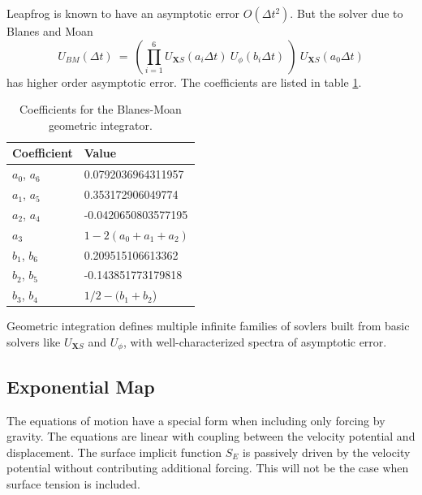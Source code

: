 \documentclass{article}
\def\Xvec{\textbf{X}}
\def\dt{\Delta t}
\begin{document}
Leapfrog is known to have an asymptotic error $O(\dt^2)$.  But the solver due to Blanes and Moan
\begin{equation}
U_{BM}(\dt) \ =\ \left( \prod_{i=1}^6 U_{\Xvec S}(a_i \dt)\ U_{\phi}(b_i \dt)\  \right) \  U_{\Xvec S}(a_0 \dt)
\end{equation}
has higher order asymptotic error.  The coefficients are listed in table \ref{bmcoeffs}.
\begin{table}
\begin{center}
\begin{tabular}{|l|l|}\hline
\bf Coefficient & \bf Value \\ \hline
$a_0$, $a_6$ & 0.0792036964311957 \\ \hline
$a_1$, $a_5$ & 0.353172906049774 \\ \hline
$a_2$, $a_4$ & -0.0420650803577195 \\ \hline
$a_3$ & $1-2(a_0+a_1+a_2)$ \\ \hline
$b_1$, $b_6$ & 0.209515106613362 \\ \hline
$b_2$, $b_5$ & -0.143851773179818 \\ \hline
$b_3$, $b_4$ & $1/2-(b_1+b_2$) \\ \hline
\end{tabular}
\end{center}
\caption{Coefficients for the Blanes-Moan geometric integrator.}\label{bmcoeffs}
\end{table}

Geometric integration defines multiple infinite families of sovlers built from basic solvers like $U_{\Xvec S}$ and $U_{\phi}$, with well-characterized spectra of asymptotic error.



\subsection{Exponential Map}

The equations of motion have a special form when including only forcing by gravity.  The equations are linear with coupling between the velocity potential and displacement.  The surface implicit function $S_E$ is passively driven by the velocity potential without contributing additional forcing.  This will not be the case when surface tension is included.
\end{document}
